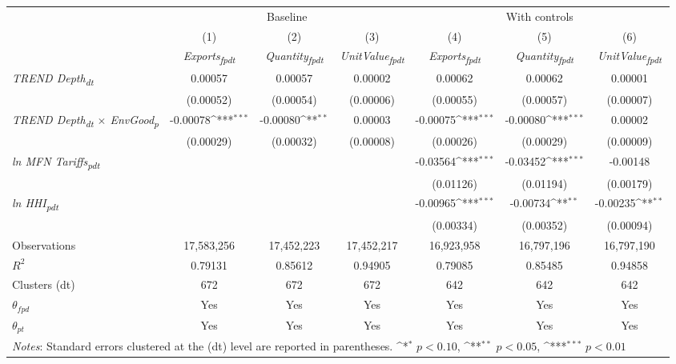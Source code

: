{
\def\sym#1{\ifmmode^{#1}\else\(^{#1}\)\fi}
\begin{tabular}{l*{6}{c}}
\toprule
&\multicolumn{3}{c}{Baseline}&\multicolumn{3}{c}{With controls}\\\cmidrule(lr){2-4}\cmidrule(lr){5-7}
&(1)&(2)&(3)&(4)&(5)&(6)\\
&\textit{Exports\textsubscript{fpdt}}&\textit{Quantity\textsubscript{fpdt}}&\textit{UnitValue\textsubscript{fpdt}}&\textit{Exports\textsubscript{fpdt}}&\textit{Quantity\textsubscript{fpdt}}&\textit{UnitValue\textsubscript{fpdt}}\\
\midrule
\textit{TREND Depth\textsubscript{dt}} & 0.00057 & 0.00057 & 0.00002 & 0.00062 & 0.00062 & 0.00001\\
 & (0.00052) & (0.00054) & (0.00006) & (0.00055) & (0.00057) & (0.00007)\\
\addlinespace
\textit{TREND Depth\textsubscript{dt} $\times$ EnvGood\textsubscript{p}} & -0.00078\sym{***} & -0.00080\sym{**} & 0.00003 & -0.00075\sym{***} & -0.00080\sym{***} & 0.00002\\
 & (0.00029) & (0.00032) & (0.00008) & (0.00026) & (0.00029) & (0.00009)\\
\addlinespace
\textit{ln MFN Tariffs\textsubscript{pdt}} &  &  &  & -0.03564\sym{***} & -0.03452\sym{***} & -0.00148\\
 &  &  &  & (0.01126) & (0.01194) & (0.00179)\\
\addlinespace
\textit{ln HHI\textsubscript{pdt}} &  &  &  & -0.00965\sym{***} & -0.00734\sym{**} & -0.00235\sym{**}\\
 &  &  &  & (0.00334) & (0.00352) & (0.00094)\\
\midrule
Observations & 17,583,256 & 17,452,223 & 17,452,217 & 16,923,958 & 16,797,196 & 16,797,190\\
$R^{2}$ & 0.79131 & 0.85612 & 0.94905 & 0.79085 & 0.85485 & 0.94858\\
Clusters (dt) & 672 & 672 & 672 & 642 & 642 & 642\\
$\theta_{fpd}$ & Yes & Yes & Yes & Yes & Yes & Yes\\
$\theta_{pt}$ & Yes & Yes & Yes & Yes & Yes & Yes\\
\bottomrule
\multicolumn{7}{l}{\footnotesize \textit{Notes}: Standard errors clustered at the (dt) level are reported in parentheses. \sym{*} \(p<0.10\), \sym{**} \(p<0.05\), \sym{***} \(p<0.01\)}\\
\end{tabular}
}
